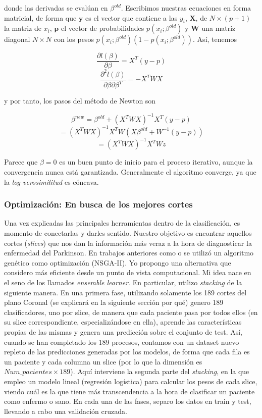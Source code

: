   donde las derivadas se evalúan en $\beta^{old}$. Escribimos nuestras ecuaciones en forma matricial, de forma que $\textbf{y}$ es el vector que contiene a las $y_i$, $\textbf{X}$, de $N \times (p+1)$ la matriz de $x_i$, $\textbf{p}$   el vector de probabilidades $p(x_i;\beta^{old})$ y $\textbf{W}$ una matriz diagonal $N \times N$ con los pesos $p(x_i;\beta^{old})(1-p(x_i;\beta^{old}))$. Así, tenemos
  
  $$\frac{\partial l(\beta)}{\partial \beta} = X^T(y-p)$$
  $$\frac{\partial^2 l(\beta)}{\partial \beta \partial \beta^T} = -X^TWX$$
  
  y por tanto, los pasos del método de Newton son
  
  $$\beta^{new} = \beta^{old} + (X^TWX)^{-1}X^T(y-p)$$
  $$ = (X^TWX)^{-1} X^T W(X \beta^{old}+W^{-1}(y-p))$$
  $$ = (X^TWX)^{-1} X^T Wz$$
  
  Parece que $\beta = 0$ es un buen punto de inicio para el proceso iterativo, aunque la convergencia nunca está garantizada. Generalmente el algoritmo converge, ya que la \textit{log-verosimilitud} es cóncava.
  
\subsubsection{Optimización: En busca de los mejores cortes}

Una vez explicadas las principales herramientas dentro de la clasificación, es momento de conectarlas y darles sentido. Nuestro objetivo es encontrar aquellos cortes (\textit{slices}) que nos dan la información más veraz a la hora de diagnosticar la enfermedad del Parkinson. En trabajos anteriores como  \cite{irojas} o \cite{alberto}  se utilizó un algoritmo genético como optimización (NSGA-II). Yo propongo una alternativa que considero más eficiente desde un punto de vista computacional. Mi idea nace en el seno de los llamados \textit{ensemble learner}. En particular, utilizo \textit{stacking} de la siguiente manera. En una primera fase, utilizando solamente los 189 cortes del plano Coronal (se explicará en la siguiente sección por qué) genero 189 clasificadores, uno por slice, de manera que cada  paciente pasa por todos ellos (en su slice correspondiente, especializándose en ella), aprende las características propias de las mismas y genera una predicción sobre el conjunto de test. Así, cuando se han completado los 189 procesos, contamos con un dataset nuevo repleto de las predicciones generadas por los modelos, de forma que cada fila es un paciente y cada columna un slice (por lo que la dimensión es $Num\_pacientes \times 189$). Aquí interviene la segunda parte del \textit{stacking}, en la que empleo un modelo lineal (regresión logística) para calcular los pesos de cada slice, viendo cuál es la que tiene más transcendencia a la hora de clasificar un paciente como enfermo o sano. En cada una de las fases, separo los datos en train y test, llevando a cabo una validación cruzada. 

